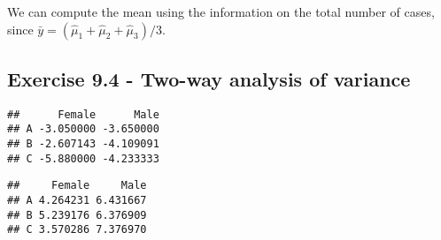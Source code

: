 \documentclass[]{book}
\newenvironment{Shaded}{\begin{snugshade}}{\end{snugshade}}
\newcommand{\CommentTok}[1]{\textcolor[rgb]{0.56,0.35,0.01}{\textit{#1}}}
\newcommand{\DataTypeTok}[1]{\textcolor[rgb]{0.13,0.29,0.53}{#1}}
\newcommand{\KeywordTok}[1]{\textcolor[rgb]{0.13,0.29,0.53}{\textbf{#1}}}
\newcommand{\NormalTok}[1]{#1}
\newcommand{\OperatorTok}[1]{\textcolor[rgb]{0.81,0.36,0.00}{\textbf{#1}}}
\newcommand{\OtherTok}[1]{\textcolor[rgb]{0.56,0.35,0.01}{#1}}
\newcommand{\StringTok}[1]{\textcolor[rgb]{0.31,0.60,0.02}{#1}}
\theoremstyle{definition}
\theoremstyle{definition}
\theoremstyle{definition}
\theoremstyle{remark}
\begin{document}
We can compute the mean using the information on the total number of cases, since \(\bar{y} = (\hat{\mu}_1+\hat{\mu}_2 + \hat{\mu}_3)/3\).

\hypertarget{exercise-9.4---two-way-analysis-of-variance}{%
\subsection{Exercise 9.4 - Two-way analysis of variance}\label{exercise-9.4---two-way-analysis-of-variance}}

\begin{Shaded}
\end{Shaded}

\begin{verbatim}
##      Female      Male
## A -3.050000 -3.650000
## B -2.607143 -4.109091
## C -5.880000 -4.233333
\end{verbatim}

\begin{Shaded}
\end{Shaded}

\begin{verbatim}
##     Female     Male
## A 4.264231 6.431667
## B 5.239176 6.376909
## C 3.570286 7.376970
\end{verbatim}
\end{document}
